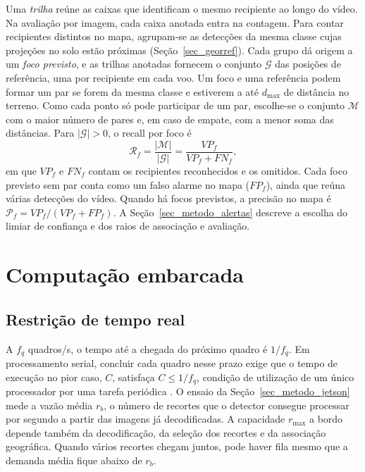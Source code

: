 Uma \emph{trilha} reúne as caixas que identificam o mesmo recipiente ao longo do vídeo. Na avaliação por imagem, cada caixa anotada entra na contagem. Para contar recipientes distintos no mapa, agrupam-se as detecções da mesma classe cujas projeções no solo estão próximas (Seção~\ref{sec_georref}). Cada grupo dá origem a um \emph{foco previsto}, e as trilhas anotadas fornecem o conjunto $\mathcal{G}$ das posições de referência, uma por recipiente em cada voo. Um foco e uma referência podem formar um par se forem da mesma classe e estiverem a até $d_{\max}$ de distância no terreno. Como cada ponto só pode participar de um par, escolhe-se o conjunto $\mathcal{M}$ com o maior número de pares e, em caso de empate, com a menor soma das distâncias. Para $|\mathcal{G}|>0$, o recall por foco é
\begin{equation}
  \mathcal{R}_f = \frac{|\mathcal{M}|}{|\mathcal{G}|} = \frac{VP_f}{VP_f+FN_f},
  \label{eq_recall_focos}
\end{equation}
em que $VP_f$ e $FN_f$ contam os recipientes reconhecidos e os omitidos. Cada foco previsto sem par conta como um falso alarme no mapa ($FP_f$), ainda que reúna várias detecções do vídeo. Quando há focos previstos, a precisão no mapa é $\mathcal{P}_f=VP_f/(VP_f+FP_f)$. A Seção~\ref{sec_metodo_alertas} descreve a escolha do limiar de confiança e dos raios de associação e avaliação.

\section{Computação embarcada}
\label{sec_embarcada}

\subsection{Restrição de tempo real}
\label{sec_tempo_real}

A $f_q$ quadros/s, o tempo até a chegada do próximo quadro é $1/f_q$. Em processamento serial, concluir cada quadro nesse prazo exige que o tempo de execução no pior caso, $C$, satisfaça $C\leq 1/f_q$, condição de utilização de um único processador por uma tarefa periódica \cite[p.~95]{laplante2004}. O ensaio da Seção~\ref{sec_metodo_jetson} mede a vazão média $r_b$, o número de recortes que o detector consegue processar por segundo a partir das imagens já decodificadas. A capacidade $r_{\max}$ a bordo depende também da decodificação, da seleção dos recortes e da associação geográfica. Quando vários recortes chegam juntos, pode haver fila mesmo que a demanda média fique abaixo de $r_b$.

